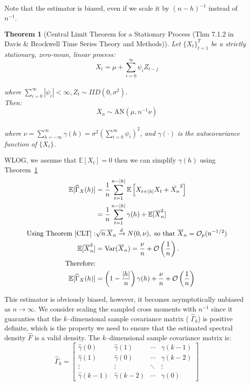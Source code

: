 \documentclass[preprint]{aastex}
\theoremstyle{nonitalicname}
\newtheorem{theorem}{Theorem}[section]
\theoremstyle{plain}
\theoremstyle{remark}
\begin{document}
Note that the estimator is biased, even if we scale it by $(n-h)^{-1}$ instead of $n^{-1}$. 
\begin{theorem}[Central Limit Theorem for a Stationary Process (Thm 7.1.2 in Davis \& Brockwell Time Series Theory and Methods)] \label{CLT}
    Let $\{X_t\}_{t=1}^T$ be a strictly stationary, zero-mean, linear process:
    $$X_t = \mu + \sum_{i=0}^\infty \psi_i Z_{t-j}$$\\
    where $\sum_{i=0}^\infty |\psi_i| < \infty, Z_t \sim IID(0,\sigma^2)$.\\
    Then:
    $$\overline X_n \sim \text{AN}(\mu, n^{-1} \nu)$$\\
    where $\nu = \sum_{h = -\infty} ^\infty \gamma(h) = \sigma^2 ( \sum_{i=0}^\infty \psi_i)^2$, and $\gamma(\cdot)$ is the autocovariance function of $\{X_t\}$.
\end{theorem}

WLOG, we assume that $\mathbb{E}[X_t] =0$ then we can simplify $\gamma(h)$ using Theorem~\ref{CLT}
\begin{equation}\label{eq:acvf_bias}
    \begin{aligned}
        \mathbb{E}[\widehat \Gamma_X(h)] &= \frac{1}{n} \sum_{t=1}^{n-|h|}\mathbb{E}\left[ X_{t+|h|} X_t + \bar{X_n}^2 \right ]\\
        & =  \frac{1}{n} \sum_{t=1}^{n-|h|} \gamma(h) + \mathbb{E}[\overline X_n^2]\\
        \text{Using Theorem} ~\ref{CLT}: &\sqrt{n}\,\overline X_n \xrightarrow{d} N(0,\nu),\text{ so that } \overline X_n = \mathcal{O}_p(n^{-1/2})\\
\mathbb{E}[\overline X_n^2] &= \operatorname{Var}(\overline X_n)
= \frac{\nu}{n} + \mathcal{O}\left(\frac{1}{n}\right).\\
\text{Therefore:}\\
       \mathbb{E}[\widehat \Gamma_X(h)] &= \left(1-\frac{|h|}{n} \right)\gamma(h) +\frac{\nu}{n} + \mathcal{O}\left(\frac{1}{n}\right)
    \end{aligned}
\end{equation}

This estimator is obviously biased, however, it becomes asymptotically unbiased as $n \rightarrow \infty$. We consider scaling the sampled cross moments with $n^{-1}$ since it guaranties that the $k$--dimensional sample covariance matrix ( $\widehat \Gamma_k$) is positive definite, which is the property we need to ensure that the estimated spectral density $\widehat F$ is a valid density. 
The $k$--dimensional sample covariance matrix is:
\begin{equation}
\label{eq:Gamma_k_toeplitz}
\hat{\Gamma}_k =
\begin{bmatrix}
\hat{\gamma}(0) & \hat{\gamma}(1) & \cdots & \hat{\gamma}(k-1) \\
\hat{\gamma}(1) & \hat{\gamma}(0) & \cdots & \hat{\gamma}(k-2) \\
\vdots          & \vdots          & \ddots & \vdots          \\
\hat{\gamma}(k-1) & \hat{\gamma}(k-2) & \cdots & \hat{\gamma}(0)
\end{bmatrix}
\end{equation}
\end{document}
